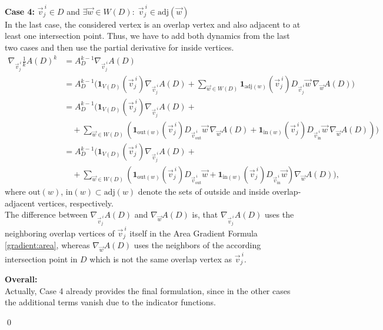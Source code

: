 \begin{proposition}
	\textbf{Case 4:} $\vec{v}_j^{\: i} \in D$ and $\exists \vec{w} \in W(D): \; \vec{v}_j^{\: i} \in \text{adj}(\vec{w})$\\
	In the last case, the considered vertex is an overlap vertex and also adjacent to at least one intersection point. 
	Thus, we have to add both dynamics from the last two cases and then use the partial derivative for inside vertices. 
	\begin{align*}
		\nabla_{\vec{v}_j^{\: i}} \frac{1}{k} A(D)^k 
		&= A_{D}^{k-1} \nabla_{\vec{v}_j^{\: i}} A(D) \\
		&= A_{D}^{k-1} \Biggl(\mathbf{1}_{V(D)}(\vec{v}_j^{\: i}) \nabla_{\vec{v}_j^{\: i}}A(D) %
							+ \sum\limits_{\vec{w} \in W(D)} \mathbf{1}_{\text{adj}(w)}(\vec{v}_j^{\: i}) D_{\vec{v}_j^{\: i}} \vec{w} \: \nabla_{\vec{w}}A(D) \Biggr)\\[0.5em]
		&= A_{D}^{k-1} \Biggl(\mathbf{1}_{V(D)}(\vec{v}_j^{\: i}) \nabla_{\vec{v}_j^{\: i}}A(D) + \\[0.5em]
							 &\quad + \sum\limits_{\vec{w} \in W(D)} \left(\mathbf{1}_{\text{out}(w)}(\vec{v}_{j}^{\: i}) D_{\vec{v}_{\text{out}}^{\: i}} \vec{w} \:\nabla_{\vec{w}}A(D) %
		+ \mathbf{1}_{\text{in}(w)}(\vec{v}_j^{\: i}) D_{\vec{v}_{\text{in}}^{\: i}} \vec{w} \: \nabla_{\vec{w}}A(D)\right) \Biggr)\\[0.5em]
		&= A_{D}^{k-1} \Biggl(\mathbf{1}_{V(D)}(\vec{v}_j^{\: i}) \nabla_{\vec{v}_j^{\: i}}A(D)  + \\[0.5em]
							 &\quad + \sum\limits_{\vec{w} \in W(D)} \left(\mathbf{1}_{\text{out}(w)}(\vec{v}_{j}^{\: i}) D_{\vec{v}_{\text{out}}^{\: i}} \vec{w} %
		+ \mathbf{1}_{\text{in}(w)}(\vec{v}_j^{\: i}) D_{\vec{v}_{\text{in}}^{\: i}} \vec{w} \right) \nabla_{\vec{w}}A(D)\Biggr),
	\end{align*}
	where $\text{out}(w)$, $\text{in}(w) \subset \text{adj}(w)$ denote the sets of outside and inside overlap-adjacent vertices, respectively.\\
	The difference between $\nabla_{\vec{v}_j^{\: i}}A(D)$ and $\nabla_{\vec{w}}A(D)$ is, that $\nabla_{\vec{v}_j^{\: i}}A(D)$ uses the neighboring overlap vertices of $\vec{v}_j^{\: i}$ itself in the Area Gradient Formula \ref{gradient:area}, whereas $\nabla_{\vec{w}}A(D)$ uses the neighbors of the according intersection point in $D$ which is not the same overlap vertex as $\vec{v}_j^{\: i}$. 
	
	\textbf{Overall:}\\
	Actually, Case 4 already provides the final formulation, since in the other cases the additional terms vanish due to the indicator functions.
		
	\qed
\end{proposition}

